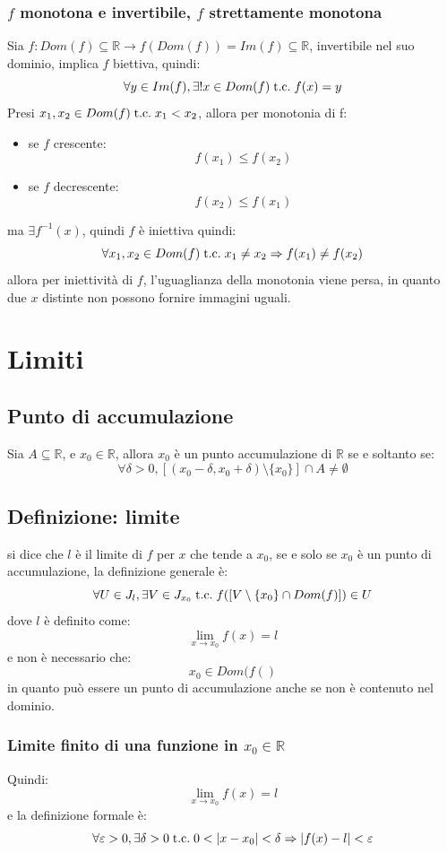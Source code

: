 \documentclass[a4paper,12pt,openright]{book}
\begin{document}
	\subsection{$f$ monotona e invertibile, $f$ strettamente monotona}
	Sia $f: Dom(f) \subseteq \mathbb{R} \longrightarrow f(Dom(f)) = Im(f) \subseteq \mathbb{R}$, invertibile nel suo dominio, implica $f$ biettiva, quindi:
	\[\forall y \in Im(f),\exists! x \in Dom(f) \;\text{t.c.}\; f(x) = y\]
	Presi $x_1, x_2 \in Dom(f) \;\text{t.c.}\; x_1 < x_2$, allora per monotonia di f:
	\begin{itemize}
		\item se $f$ crescente:
		\[f(x_1) \leq f(x_2)\]
		\item se $f$ decrescente:
		\[f(x_2) \leq f(x_1)\]
	\end{itemize}
	ma $\exists f^{-1}(x)$, quindi $f$ è iniettiva quindi:
	\[\forall x_1,x_2 \in Dom(f) \;\text{t.c.}\; x_1 \not = x_2 \Rightarrow f(x_1) \not = f(x_2)\]
	allora per iniettività di $f$, l'uguaglianza della monotonia viene persa, in quanto due $x$ distinte non possono fornire immagini uguali.
	
	\chapter{Limiti}
	\section{Punto di accumulazione}
	Sia $A \subseteq \mathbb{R}$, e $x_0 \in \mathbb{R}$, allora $x_0$ è un punto accumulazione di $\mathbb{R}$ se e soltanto se:
	\[\forall \delta > 0, [(x_0 - \delta, x_0 + \delta)\setminus \{x_0\}] \cap A \not = \emptyset\]
	
	\section{Definizione: limite}
	si dice che $l$ è il limite di $f$ per $x$ che tende a $x_0$, se e solo se $x_0$ è un punto di accumulazione, la definizione generale è:
	\[\forall U \in J_l, \exists V \in J_{x_0} \;\text{t.c.}\; f([V \setminus \{x_0\} \cap Dom(f)]) \in U\]
	dove $l$ è definito come:
	\[\lim_{x \rightarrow x_0} f(x) = l\]
	e non è necessario che:
	\[x_0 \in Dom(f()\]
	in quanto può essere un punto di accumulazione anche se non è contenuto nel dominio.
	
	\subsection{Limite finito di una funzione in $x_0 \in \mathbb{R}$}
	Quindi:
	\[\lim_{x \rightarrow x_0} f(x) = l\]
	e la definizione formale è:
	\[\forall \varepsilon > 0, \exists \delta > 0 \;\text{t.c.}\; 0 < |x - x_0| < \delta \Rightarrow |f(x) - l| < \varepsilon\]
	
\end{document}

